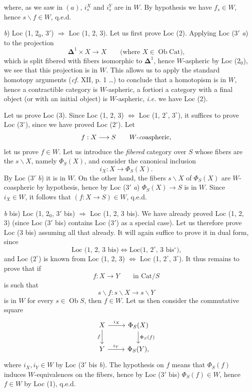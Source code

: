 \documentclass[11pt]{article}
\newcommand{\printedpage}[1]{\marginpar{\footnotesize p.~#1}}
\newcommand{\msp}[1]{\marginpar{\footnotesize [#1]}}
\begin{document}
\setcounter{footnote}{2}

\printedpage{4}
where, as we saw in $(a)$, $i_s^X$ and $i_s^Y$ are in $W$. By hypothesis we have $f_s \in W$, hence $s\backslash f \in W$, q.e.d.

\textit{b}) Loc (1, $2_0$, $3'$) $\Longrightarrow$ Loc (1, 2, 3). Let us first prove Loc (2). Applying Loc ($3'$ \textit{a}) to the projection
\[
\boldsymbol{\Delta}^1 \times X \longrightarrow X \qquad \text{(where $X \in \operatorname{Ob}\mathrm{Cat}$),}
\]
which is split fibered with fibers isomorphic to $\boldsymbol{\Delta}^1$, hence $W$-aspheric by Loc ($2_0$), we see that this projection is in $W$. This allows us to apply the standard homotopy arguments (\textit{cf.} XII, p. 1 \ldots) to conclude that a homotopism is in $W$, hence a contractible category is $W$-aspheric, a fortiori a category with a final object (or with an initial object) is $W$-aspheric, \textit{i.e.} we have Loc (2).

Let us prove Loc (3). Since Loc (1, 2, 3) $\Longleftrightarrow$ Loc (1, $2^\circ$, $3^\circ$), it suffices to prove Loc ($3^\circ$), since we have proved Loc ($2^\circ$). Let
\[
f : X \longrightarrow S \qquad \text{$W$-\textit{co}aspheric,}
\]
let us prove $f \in W$. Let us introduce the \textit{fibered} category over $S$ whose fibers are the $s\backslash X$, namely $\Phi_S(X)$, and consider the canonical inclusion
\[
i_X : X \longrightarrow \Phi_S(X).
\]
\msp{page 7}By Loc ($3'$ \textit{b}) it is in $W$. On the other hand, the fibers $s\backslash X$ of $\Phi_S(X)$ are $W$-coaspheric by hypothesis, hence by Loc ($3'$ \textit{a}) $\Phi_S(X) \longrightarrow S$ is in $W$. Since $i_X \in W$, it follows that $(f : X \longrightarrow S) \in W$, q.e.d.

\textit{b} bis) Loc (1, $2_0$, $3'$ bis) $\Longrightarrow$ Loc (1, 2, 3 bis). We have already proved Loc (1, 2, 3) (since Loc ($3'$ bis) contains Loc ($3'$) as a special case). Let us therefore prove Loc (3 bis) assuming all that already. It will again suffice to prove it in dual form, since
\[
\text{Loc (1, 2, 3 bis)} \iff \text{Loc(1, $2^\circ$, 3 bis$^\circ$),}
\]
\msp{page 8}and Loc ($2^\circ$) is known from Loc (1, 2, 3) $\Longleftrightarrow$ Loc (1, $2^\circ$, $3^\circ$). It thus remains to prove that if
\[
f : X \longrightarrow Y \qquad \text{in } \mathrm{Cat}/S
\]
is such that
\[
s\backslash f : s\backslash X \longrightarrow s\backslash Y
\]
is in $W$ for every $s \in \operatorname{Ob} S$, then $f \in W$. Let us then consider the commutative square
\[
\begin{tikzcd}
X \arrow[r, "i_X"] \arrow[d, "f"'] & \Phi_S(X) \arrow[d, "\Phi_S(f)"] \\
Y \arrow[r, "i_Y"] & \Phi_S(Y),
\end{tikzcd}
\]
where $i_X, i_Y \in W$ by Loc ($3'$ bis \textit{b}). The hypothesis on $f$ means that $\Phi_S(f)$ induces $W$-equivalences on the fibers, hence by Loc ($3'$ bis) $\Phi_S(f) \in W$, hence $f \in W$ by Loc (1), q.e.d.
\end{document}
